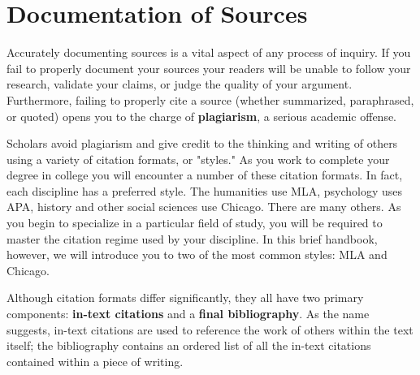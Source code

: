 


\chapter{Documentation of Sources}

Accurately documenting sources is a vital aspect of any process of inquiry. If you fail to 
properly document your sources your readers will be unable to follow your research, 
validate your claims, or judge the quality of your argument. Furthermore, failing to 
properly cite a source (whether summarized, paraphrased, or quoted) opens you to the 
charge of \textbf{plagiarism}, a serious academic offense. 

Scholars avoid plagiarism and give credit to the thinking and writing of others using a 
variety of citation formats, or "styles." As you work to complete your degree in college 
you will encounter a number of these citation formats. In fact, each discipline has a 
preferred style. The humanities use MLA, psychology uses APA, history and other social 
sciences use Chicago. There are many others. As you begin to specialize in a particular 
field of study, you will be required to master the citation regime used by your discipline. 
In this brief handbook, however, we will introduce you to two of the most common 
styles: MLA and Chicago.

Although citation formats differ significantly, they all have two primary components: 
\textbf{in-text citations} and a \textbf{final bibliography}. As the name suggests, in-text 
citations are used to reference the work of others within the text itself; the 
bibliography contains an ordered list of all the in-text citations contained within a 
piece of writing.


